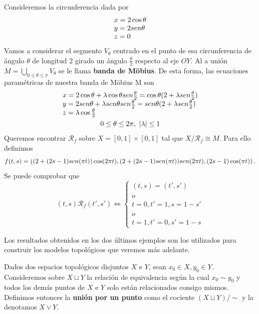 \documentclass[GTS.tex]{subfiles}
\begin{document}
\begin{ej}
Consideremos la circunferencia dada por
\begin{gather*}
\begin{array}{l}
x=2\cos\theta\\
y=2sen \theta\\
z=0
\end{array}
\end{gather*}
Vamos a considerar el segmento $V_\theta$  centrado en el punto de esa circunferencia de ángulo $\theta$ de longitud $2$ girado un ángulo $\frac{\theta}{2}$ respecto al eje $OY$. Al a unión $M=\underset{0\leq\theta\leq\pi}{\bigcup}V_\theta$ se le llama \textbf{banda de Möbius}. De esta forma, las ecuaciones paramétricas de nuestra banda de Möbius M son
\begin{gather*}
\begin{array}{l}
x=2\cos\theta +\lambda \cos\theta sen \frac{\theta}{2}=\cos\theta(2+\lambda sen \frac{\theta}{2})\\
y=2sen \theta +\lambda sen \theta sen \frac{\theta}{2}=sen \theta(2+\lambda sen \frac{\theta}{2})\\
z=\lambda \cos\frac{\theta}{2}\\
\end{array}\\
0\leq\theta\leq 2\pi,\ |\lambda|\leq 1
\end{gather*}
Queremos encontrar $\mathcal{R}_f$ sobre $X=[0,1]\times[0,1]$ tal que $X/\mathcal{R}_f\cong M$. Para ello definimos
\[
f(t,s)=\left((2+(2s-1)sen(\pi t))\cos(2\pi t),(2+(2s-1)sen (\pi t))sen (2\pi t),(2s-1)\cos(\pi t) \right).
\]
Se puede comprobar que
\[
(t,s)\mathcal{R}_f (t',s')\Leftrightarrow\begin{cases}
(t,s)=(t',s')\\
\acute{o}\\
t=0,t'=1, s=1-s'\\
\acute{o}\\
t=1,t'=0,s'=1-s
\end{cases}
\]
\end{ej}

\vspace{0.2cm}

\begin{nota} Los resultados obtenidos en los dos últimos ejemplos son los utilizados para construir los modelos topológicos que veremos más adelante.
\end{nota}

\begin{defi}
Dados dos espacios topológicos disjuntos $X$ e $Y$, sean $x_0\in X, y_0\in Y$. Consideremos sobre $X\sqcup Y$ la relación de equivalencia según la cual $x_0\sim y_0$ y todos los demás puntos de $X$ e $Y$ solo están relacionados consigo mismos. Definimos entonces la \textbf{unión por un punto} como el cociente $(X\sqcup Y)/\sim$ y la denotamos $X\vee Y$.
\end{defi}
\end{document}
